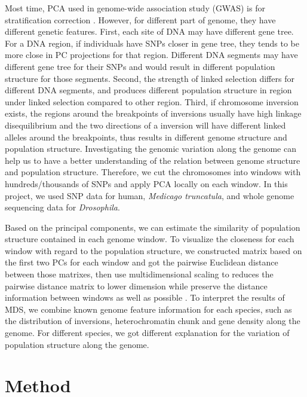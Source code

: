 \documentclass[11pt, oneside]{article}   	%
\begin{document}
\noindent  Most time, PCA used in genome-wide association study (GWAS) is for stratification correction \cite{key7}. However, for different part of genome, they have different genetic features. First, each site of DNA may have different gene tree. For a DNA region, if individuals have SNPs closer in gene tree, they tends to be more close in PC projections for that region. Different DNA segments may have different gene tree for their SNPs and would result in different population structure for those segments. Second, the strength of linked selection differs for different DNA segments, and produces different population structure in region under linked selection compared to other region. Third, if chromosome inversion exists, the regions around the breakpoints of inversions usually have high linkage disequilibrium and the two directions of a inversion will have different linked alleles around the breakpoints, thus results in different genome structure and population structure. Investigating the genomic variation along the genome can help us to have a better understanding of the relation between genome structure and population structure. Therefore, we cut the chromosomes into windows with hundreds/thousands of SNPs and apply PCA locally on each window. In this project, we used SNP data for human, \textit{Medicago truncatula}, and whole genome sequencing data for \textit{Drosophila}.

\noindent Based on the principal components, we can estimate the similarity of population structure contained in each genome window. To visualize the closeness for each window with regard to the population structure, we constructed matrix based on the first two PCs for each window and got the pairwise Euclidean distance between those matrixes, then use multidimensional scaling to reduces the pairwise distance matrix to lower dimension while preserve the distance information between windows as well as possible \cite{key5}. To interpret the results of MDS, we combine known genome feature information for each species, such as the distribution of inversions, heterochromatin chunk and gene density along the genome. For different species, we got different explanation for the variation of population structure along the genome.

\section{Method}
\end{document}
